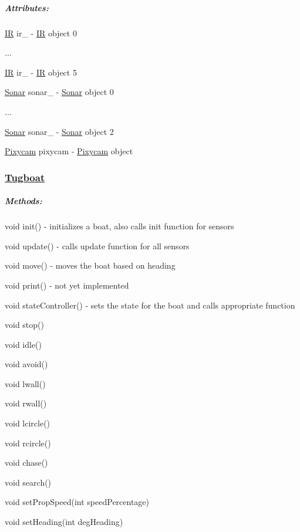 \subparagraph*{Attributes\+:}


\begin{DoxyItemize}
\item {\ttfamily \hyperlink{class_i_r}{IR} ir\+\_} -\/ \hyperlink{class_i_r}{IR} object 0
\item ...
\item {\ttfamily \hyperlink{class_i_r}{IR} ir\+\_} -\/ \hyperlink{class_i_r}{IR} object 5
\item {\ttfamily \hyperlink{class_sonar}{Sonar} sonar\+\_} -\/ \hyperlink{class_sonar}{Sonar} object 0
\item ...
\item {\ttfamily \hyperlink{class_sonar}{Sonar} sonar\+\_} -\/ \hyperlink{class_sonar}{Sonar} object 2
\item {\ttfamily \hyperlink{class_pixycam}{Pixycam} pixycam} -\/ \hyperlink{class_pixycam}{Pixycam} object
\end{DoxyItemize}

\subsubsection*{\hyperlink{class_tugboat}{Tugboat}}

\subparagraph*{Methods\+:}


\begin{DoxyItemize}
\item {\ttfamily void init()} -\/ initializes a boat, also calls init function for sensors
\item {\ttfamily void update()} -\/ calls update function for all sensors
\item {\ttfamily void move()} -\/ moves the boat based on heading
\item {\ttfamily void print()} -\/ not yet implemented
\item {\ttfamily void state\+Controller()} -\/ sets the state for the boat and calls appropriate function
\item {\ttfamily void stop()}
\item {\ttfamily void idle()}
\item {\ttfamily void avoid()}
\item {\ttfamily void lwall()}
\item {\ttfamily void rwall()}
\item {\ttfamily void lcircle()}
\item {\ttfamily void rcircle()}
\item {\ttfamily void chase()}
\item {\ttfamily void search()}
\item {\ttfamily void set\+Prop\+Speed(int speed\+Percentage)}
\item {\ttfamily void set\+Heading(int deg\+Heading)}
\end{DoxyItemize}

